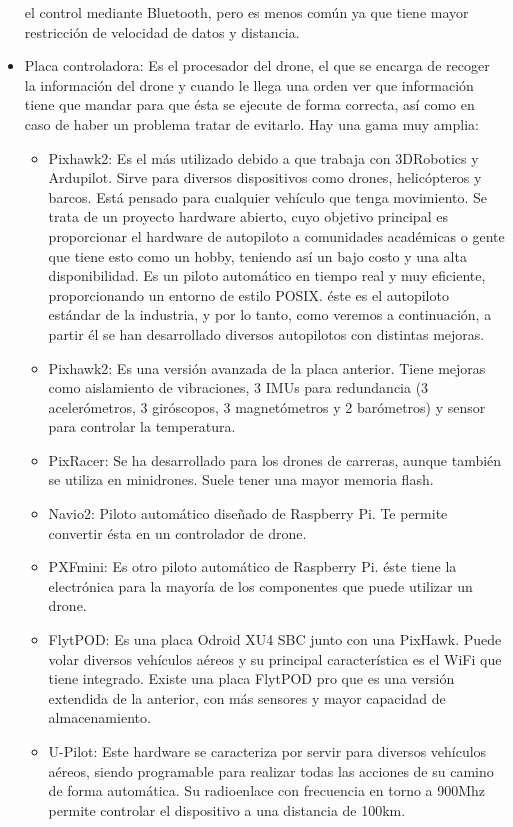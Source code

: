 \begin{itemize}
el control mediante Bluetooth, pero es menos común ya que tiene mayor restricción de
velocidad de datos y distancia.
\item Placa controladora: Es el procesador del drone, el que se encarga de recoger
la información del drone y cuando le llega una orden ver que información tiene que
mandar para que ésta se ejecute de forma correcta, así como en caso de haber un
problema tratar de evitarlo. Hay una gama muy amplia:
	\begin{itemize}
	\item Pixhawk2: Es el más utilizado debido a que trabaja con 3DRobotics y Ardupilot.
Sirve para diversos dispositivos como drones, helicópteros y barcos. Está pensado
para cualquier vehículo que tenga movimiento. Se trata de un proyecto hardware
abierto, cuyo objetivo principal es proporcionar el hardware de autopiloto a
comunidades académicas o gente que tiene esto como un hobby, teniendo así
un bajo costo y una alta disponibilidad. Es un piloto automático en tiempo real
y muy eficiente, proporcionando un entorno de estilo POSIX. éste es el autopiloto
estándar de la industria, y por lo tanto, como veremos a continuación, a partir
él se han desarrollado diversos autopilotos con distintas mejoras.
	\item Pixhawk2: Es una versión avanzada de la placa anterior. Tiene mejoras
como aislamiento de vibraciones, 3 IMUs para redundancia (3 acelerómetros,
3 giróscopos, 3 magnetómetros y 2 barómetros) y sensor para controlar la
temperatura.
	\item PixRacer: Se ha desarrollado para los drones de carreras, aunque también se
utiliza en minidrones. Suele tener una mayor memoria flash.
	\item Navio2: Piloto automático diseñado de Raspberry Pi. Te permite convertir ésta
en un controlador de drone.
	\item PXFmini: Es otro piloto automático de Raspberry Pi. éste tiene la electrónica
para la mayoría de los componentes que puede utilizar un drone.
	\item FlytPOD: Es una placa Odroid XU4 SBC junto con una PixHawk. Puede
volar diversos vehículos aéreos y su principal característica es el WiFi que tiene
integrado. Existe una placa FlytPOD pro que es una versión extendida de la
anterior, con más sensores y mayor capacidad de almacenamiento.
	\item U-Pilot: Este hardware se caracteriza por servir para diversos vehículos aéreos,
siendo programable para realizar todas las acciones de su camino de forma
automática. Su radioenlace con frecuencia en torno a 900Mhz permite controlar
el dispositivo a una distancia de 100km.
	\end{itemize}

\end{itemize}

